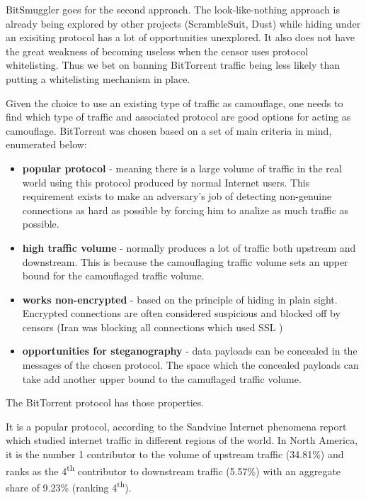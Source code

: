 \documentclass[11pt]{book} %
\newcommand{\projectName}{BitSmuggler }
\begin{document}
\projectName goes for the second approach. The look-like-nothing approach is already being explored by other projects (ScrambleSuit, Dust) while hiding under an exisiting protocol has a lot of opportunities unexplored. It also does not have the great weakness of becoming useless when the censor uses protocol whitelisting. Thus we bet on banning BitTorrent traffic being less likely than putting a whitelisting mechanism in place.

Given the choice to use an existing type of traffic as camouflage, one needs to find which type of traffic and associated protocol are good options for acting as camouflage. BitTorrent was chosen based on a set of main criteria in mind, enumerated below:

\begin{itemize}
\item \textbf{popular protocol} - meaning there is a large volume of traffic in the real world using this protocol produced by normal Internet users. This requirement exists to make an adversary's job of detecting non-genuine connections as hard as possible by forcing him to analize as much traffic as possible.
\item \textbf{high traffic volume} - normally produces a lot of traffic both upstream and downstream. This is because the camouflaging traffic volume sets an upper bound for the camouflaged traffic volume.
\item \textbf{works non-encrypted} - based on the principle of hiding in plain sight. Encrypted connections are often considered suspicious and blocked off by censors (Iran was blocking all connections which used SSL \citep*{web:iranBlocksEncryptedTraffic})
\item \textbf{opportunities for steganography} - data payloads can be concealed in the messages of the chosen protocol. The space which the concealed payloads can take add another upper bound to the camuflaged traffic volume.

\end{itemize}

The BitTorrent protocol has those properties.

It is a popular protocol, according to the Sandvine Internet phenomena report \citep*{web:sandvineInternet} which studied internet traffic in different regions of the world. In North America, it is the number 1 contributor to the volume of upstream traffic (34.81\%) and ranks as the 4\textsuperscript{th} contributor to downstream traffic (5.57\%) with an aggregate share of 9.23\% (ranking 4\textsuperscript{th}).
\end{document}
